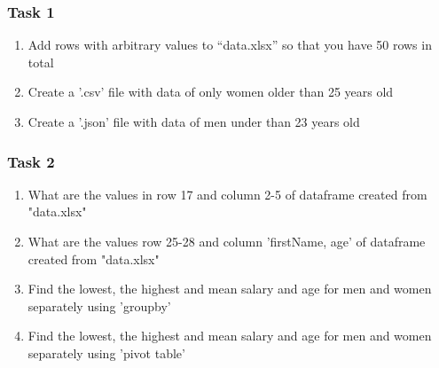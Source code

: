 \documentclass{beamer}
\begin{document}
\begin{frame}
    \frametitle{Task 1}
    \begin{enumerate}
        \item Add rows with arbitrary values to “data.xlsx” so that you have 50 rows in total
        \item Create a '.csv' file with data of only women older than 25 years old        
        \item Create a '.json' file with data of men under than 23 years old
    \end{enumerate}
\end{frame}

\begin{frame}
    \frametitle{Task 2}
    \begin{enumerate}
        \item What are the values in row 17 and column 2-5 of dataframe created from "data.xlsx"
        \item What are the values row 25-28 and column 'firstName, age' of dataframe created from "data.xlsx"
        \item Find the lowest, the highest and mean salary and age for men and women separately using 'groupby'
        \item Find the lowest, the highest and mean salary and age for men and women separately using 'pivot table'
    \end{enumerate}
\end{frame}

\end{document}
